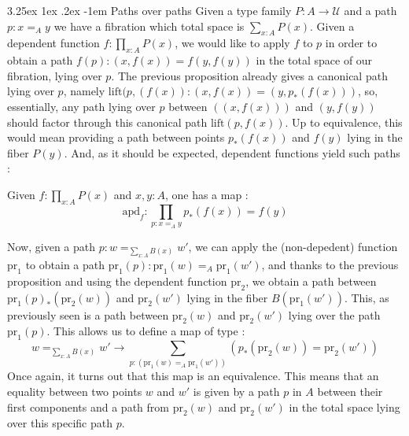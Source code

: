 \documentclass{report}
\makeatletter
\renewcommand\paragraph{\@startsection{paragraph}{5}{\z@}%
  {3.25ex \@plus1ex \@minus.2ex}%
  {-1em}%
  {\normalfont\normalsize\bfseries}}
\makeatother
\begin{document}
\paragraph{Paths over paths} Given a type family $P : A \rightarrow \mathcal{U}$ and a path $p : x=_A y$ we have a fibration which total space is $\sum_{x : A} P(x)$. Given a dependent function $f : \prod_{x :A } P(x)$, we would like to apply $f$ to $p$ in order to obtain a path $f(p) : (x,f(x))=f(y,f(y))$ in the total space of our fibration, lying over $p$. The previous proposition already gives a canonical path lying over $p$, namely $\mathrm{lift}(p,(f(x)) : (x,f(x)) = (y,p_*(f(x)))$, so, essentially, any path lying over $p$ between $((x,f(x)))$ and $(y,f(y))$ should factor through this canonical path $\mathrm{lift}(p,f(x))$. Up to equivalence, this would mean providing a path between points $p_*(f(x))$ and $f(y)$ lying in the fiber $P(y)$. And, as it should be expected, dependent functions yield such paths : 
\begin{prop}
Given $f : \prod_{x : A} P(x)$ and $x,y : A$, one has a map : 
$$\mathrm{apd}_f : \prod_{p : x=_A y} p_*(f(x))=f(y)$$
\end{prop}
Now, given a path $p :w =_{\sum_{x : A} B(x)} w'$, we can apply the (non-depedent) function $\mathrm{pr}_1$ to obtain a path $\mathrm{pr}_1(p) : \mathrm{pr}_1(w) =_A \mathrm{pr}_1(w')$, and thanks to the previous proposition and using the dependent function $\mathrm{pr}_2$, we obtain a path between $\mathrm{pr}_1(p)_*(\mathrm{pr}_2(w))$ and $\mathrm{pr}_2(w')$ lying in the fiber $B(\mathrm{pr}_1(w'))$. This, as previously seen is a path between $\mathrm{pr}_2(w)$ and $\mathrm{pr}_2(w')$ lying over the path $\mathrm{pr}_1(p)$. This allows us to define a map of type : 
$$w=_{\sum_{x : A} B(x)} w' \rightarrow \sum_{p : (\mathrm{pr}_1(w)=_A \mathrm{pr}_1(w'))} (p_*(\mathrm{pr}_2(w))=\mathrm{pr}_2(w'))$$
Once again, it turns out that this map is an equivalence.
This means that an equality between two points $w$ and $w'$ is given by a path $p$ in $A$ between their first components and a path from $\mathrm{pr}_2(w)$ and $\mathrm{pr}_2(w')$ in the total space lying over this specific path $p$.
\end{document}
